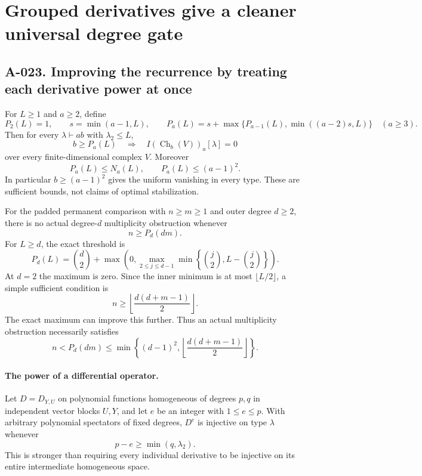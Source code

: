 \section{Grouped derivatives give a cleaner universal degree gate}

\subsection*{A-023. Improving the recurrence by treating each derivative power at once}
For $L\geq1$ and $a\geq2$, define
\[
 P_2(L)=1,\qquad s=\min(a-1,L),\qquad
 P_a(L)=s+\max\{P_{a-1}(L),\min((a-2)s,L)\}
                        \quad(a\geq3).                \tag{A-023.1}
\]
Then for every $\lambda\vdash ab$ with $\lambda_2\leq L$,
\[
 b\geq P_a(L)
 \quad\Longrightarrow\quad
 I(\operatorname{Ch}_b(V))_a[\lambda]=0                 \tag{A-023.2}
\]
over every finite-dimensional complex $V$. Moreover
\[
           P_a(L)\leq N_a(L),\qquad P_a(L)\leq(a-1)^2. \tag{A-023.3}
\]
In particular $b\geq(a-1)^2$ gives the uniform vanishing
in every type. These are sufficient bounds, not claims of
optimal stabilization.

For the padded permanent comparison with $n\geq m\geq1$
and outer degree $d\geq2$, there is no actual degree-$d$
multiplicity obstruction whenever
\[
                              n\geq P_d(dm).           \tag{A-023.4}
\]
For $L\geq d$, the exact threshold is
\[
 \boxed{\quad P_d(L)=\binom d2+
       \max\left(0,\max_{2\leq j\leq d-1}
           \min\left\{\binom j2,L-\binom j2\right\}\right).\quad}
                                                               \tag{A-023.5}
\]
At $d=2$ the maximum is zero. Since the inner minimum is at
most $\lfloor L/2\rfloor$, a simple sufficient condition is
\[
       \boxed{\quad n\geq
              \left\lfloor\frac{d(d+m-1)}2\right\rfloor.\quad}
                                                               \tag{A-023.6}
\]
The exact maximum can improve this further. Thus an actual
multiplicity obstruction necessarily satisfies
\[
 n<P_d(dm)\leq
 \min\left\{(d-1)^2,
             \left\lfloor\frac{d(d+m-1)}2\right\rfloor\right\}.
                                                               \tag{A-023.7}
\]

\paragraph{The power of a differential operator.}
Let $D=D_{Y,U}$ on polynomial functions homogeneous of degrees
$p,q$ in independent vector blocks $U,Y$, and let $e$ be an
integer with $1\leq e\leq p$. With arbitrary polynomial
spectators of fixed degrees, $D^e$ is injective on type
$\lambda$ whenever
\[
                         p-e\geq\min(q,\lambda_2).     \tag{A-023.8}
\]
This is stronger than requiring every individual derivative to
be injective on its entire intermediate homogeneous space.

